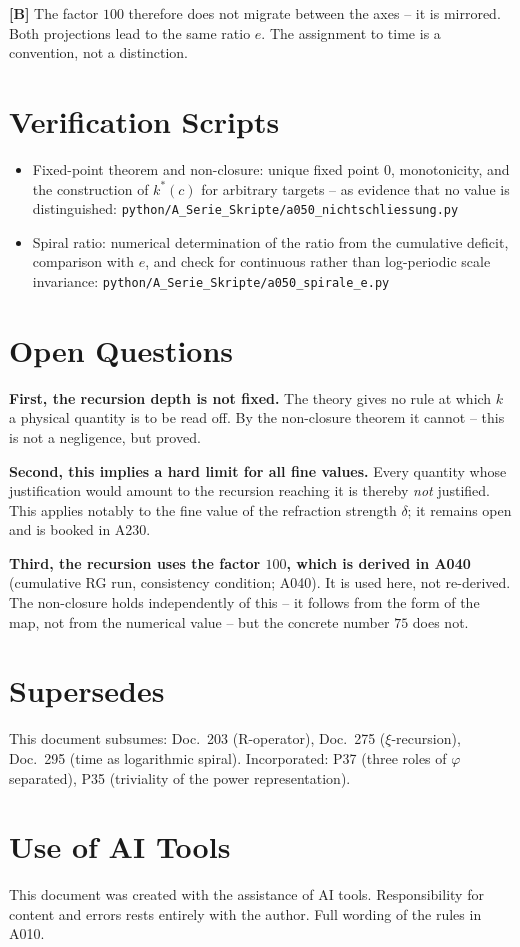 \textbf{[B]} The factor $100$ therefore does not migrate between the axes -- it
is mirrored. Both projections lead to the same ratio $e$. The assignment to time
is a convention, not a distinction.

\section{Verification Scripts}

\begin{itemize}
  \item Fixed-point theorem and non-closure: unique fixed point $0$, monotonicity,
    and the construction of $k^*(c)$ for arbitrary targets -- as evidence that
    no value is distinguished:
    \texttt{python/A\_Serie\_Skripte/a050\_nichtschliessung.py}
  \item Spiral ratio: numerical determination of the ratio from the cumulative
    deficit, comparison with $e$, and check for continuous rather than
    log-periodic scale invariance:
    \texttt{python/A\_Serie\_Skripte/a050\_spirale\_e.py}
\end{itemize}

\section{Open Questions}

\textbf{First, the recursion depth is not fixed.} The theory gives no rule
at which $k$ a physical quantity is to be read off. By the non-closure theorem
it cannot -- this is not a negligence, but proved.

\textbf{Second, this implies a hard limit for all fine values.} Every quantity
whose justification would amount to the recursion reaching it is thereby
\emph{not} justified. This applies notably to the fine value of the refraction
strength $\delta$; it remains open and is booked in A230.

\textbf{Third, the recursion uses the factor $100$, which is derived in A040}
(cumulative RG run, consistency condition; A040). It is used here, not
re-derived. The non-closure holds independently of this -- it follows from
the form of the map, not from the numerical value -- but the concrete number
$75$ does not.

\section{Supersedes}

This document subsumes: Doc.~203 (R-operator), Doc.~275 ($\xi$-recursion),
Doc.~295 (time as logarithmic spiral). Incorporated: P37 (three roles of
$\varphi$ separated), P35 (triviality of the power representation).

\section{Use of AI Tools}

This document was created with the assistance of AI tools.
Responsibility for content and errors rests entirely with the author.
Full wording of the rules in A010.
